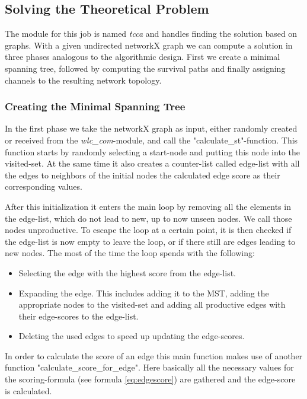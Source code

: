       \clearpage
      \newpage
      
    \subsection{Solving the Theoretical Problem}
      The module for this job is named \textit{tcca} and handles finding the solution based on graphs.
      With a given undirected networkX graph we can compute a solution in three phases analogous to the algorithmic design.
      First we create a minimal spanning tree, followed by computing the survival paths and finally assigning channels to the resulting network topology.

      \subsubsection{Creating the Minimal Spanning Tree}
	In the first phase we take the networkX graph as input, either randomly created or received from the \textit{wlc\_com}-module, and call the "calculate\_st"-function.
	This function starts by randomly selecting a start-node and putting this node into the visited-set. 
	At the same time it also creates a counter-list called edge-list with all the edges to neighbors 
	of the initial nodes the calculated edge score as their corresponding values.
	
	After this initialization it enters the main loop by removing all the elements in the edge-list, which do not lead to new, up to now unseen nodes. 
	We call those nodes unproductive.
	To escape the loop at a certain point, it is then checked if the edge-list is now empty to leave the loop, or if there still are edges leading to new nodes.
	The most of the time the loop spends with the following:
	
	\begin{itemize}
	 \item Selecting the edge with the highest score from the edge-list.
	 
	 \item Expanding the edge. This includes adding it to the \ac{MST}, adding the appropriate nodes to the visited-set and 
	  adding all productive edges with their edge-scores to the edge-list.
	 
	 \item Deleting the used edges to speed up updating the edge-scores.
	\end{itemize}
	
	In order to calculate the score of an edge this main function makes use of another function "calculate\_score\_for\_edge".
	Here basically all the necessary values for the scoring-formula (see formula \ref{eq:edgescore}) are gathered and the edge-score is calculated.
	
